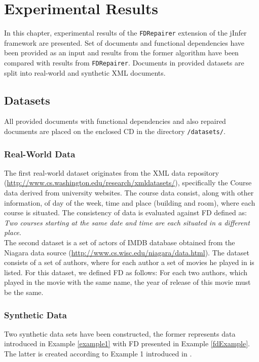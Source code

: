 \chapter{Experimental Results}

In this chapter, experimental results of the \texttt{FDRepairer} extension of the jInfer framework are presented. Set of documents and functional dependencies have been provided as an input and results from the former algorithm have been compared with results from \texttt{FDRepairer}. Documents in provided datasets are split into real-world and synthetic XML documents.

\section{Datasets}

All provided documents with functional dependencies and also repaired documents are placed on the enclosed CD in the directory \texttt{/datasets/}.

\subsection{Real-World Data}

The first real-world dataset originates from the XML data repository \\(\url{http://www.cs.washington.edu/research/xmldatasets/}), specifically the Course data derived from university websites. The course data consist, along with other information, of day of the week, time and place (building and room), where each course is situated. The consistency of data is evaluated against FD defined as: \emph{Two courses starting at the same date and time are each situated in a different place}.\\

The second dataset is a set of actors of IMDB database obtained from the Niagara data source (\url{http://www.cs.wisc.edu/niagara/data.html}). The dataset consists of a set of authors, where for each author a set of movies he played in is listed. For this dataset, we defined FD as follows: For each two authors, which played in the movie with the same name, the year of release of this movie must be the same.

\subsection{Synthetic Data}

Two synthetic data sets have been constructed, the former represents data introduced in Example \ref{example1} with FD presented in Example \ref{fdExample}. The latter is created according to Example 1 introduced in \cite{ImprovingXML}.

